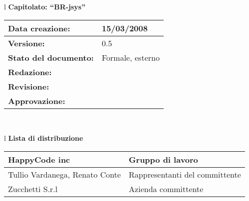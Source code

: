 

\newcommand{\lv}{ 0.5 } %
\newcommand{\dt}{ Modifiche ai documenti }%
\newcommand{\Grammatica}{} %

\begin{center}
\thispagestyle{plain}
\begin{table}[htbp]
\large{
\begin{tabular}{l}
\Large{\textbf{\textsf{Capitolato: ``BR-jsys''}}} \\
\begin{tabular}{|p{6cm}|p{6cm}|} \hline
\textbf{Data creazione:} & 15/03/2008 \\ \hline
\textbf{Versione:} & \lv \\ \hline
\textbf{Stato del documento:} & Formale, esterno \\ \hline
\textbf{Redazione:} &  \AT \\ \hline
\textbf{Revisione:} & \MT \\ \hline
\textbf{Approvazione:} & \MM \\ \hline
\end{tabular} \\
\end{tabular}
}
\end{table}

\begin{table}[hbtp]
\large{
\begin{tabular}{l}
\Large{\textbf{\textsf{Lista di distribuzione}}} \\

\begin{tabular}{|p{6cm}|p{6cm}|} \hline
{HappyCode inc}& Gruppo di lavoro\\ \hline
{Tullio Vardanega, Renato Conte}& Rappresentanti del committente \\ \hline
{Zucchetti S.r.l}& Azienda committente\\ \hline
\end{tabular} \\
\end{tabular}
}
\end{table}
\begin{table}[hbtp]


\end{table}
\end{center}
